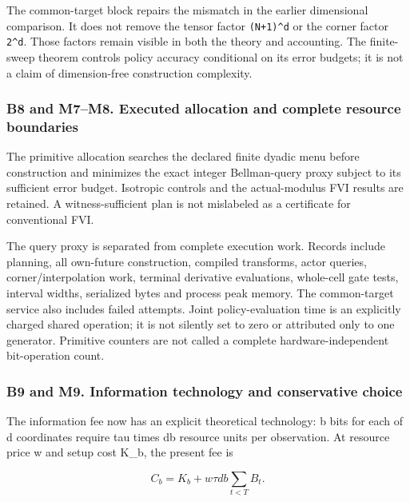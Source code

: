 The common-target block repairs the mismatch in the earlier dimensional
comparison. It does not remove the tensor factor \texttt{(N+1)\^{}d} or
the corner factor \texttt{2\^{}d}. Those factors remain visible in both
the theory and accounting. The finite-sweep theorem controls policy
accuracy conditional on its error budgets; it is not a claim of
dimension-free construction complexity.

\hypertarget{b8-and-m7m8.-executed-allocation-and-complete-resource-boundaries}{%
\subsubsection{B8 and M7--M8. Executed allocation and complete resource
boundaries}\label{b8-and-m7m8.-executed-allocation-and-complete-resource-boundaries}}

The primitive allocation searches the declared finite dyadic menu before
construction and minimizes the exact integer Bellman-query proxy subject
to its sufficient error budget. Isotropic controls and the
actual-modulus FVI results are retained. A witness-sufficient plan is
not mislabeled as a certificate for conventional FVI.

The query proxy is separated from complete execution work. Records
include planning, all own-future construction, compiled transforms,
actor queries, corner/interpolation work, terminal derivative
evaluations, whole-cell gate tests, interval widths, serialized bytes
and process peak memory. The common-target service also includes failed
attempts. Joint policy-evaluation time is an explicitly charged shared
operation; it is not silently set to zero or attributed only to one
generator. Primitive counters are not called a complete
hardware-independent bit-operation count.

\hypertarget{b9-and-m9.-information-technology-and-conservative-choice}{%
\subsubsection{B9 and M9. Information technology and conservative
choice}\label{b9-and-m9.-information-technology-and-conservative-choice}}

The information fee now has an explicit theoretical technology: b bits
for each of d coordinates require tau times db resource units per
observation. At resource price w and setup cost K\_b, the present fee is

\[
 C_b=K_b+w\tau db\sum_{t<T}B_t.
\]

